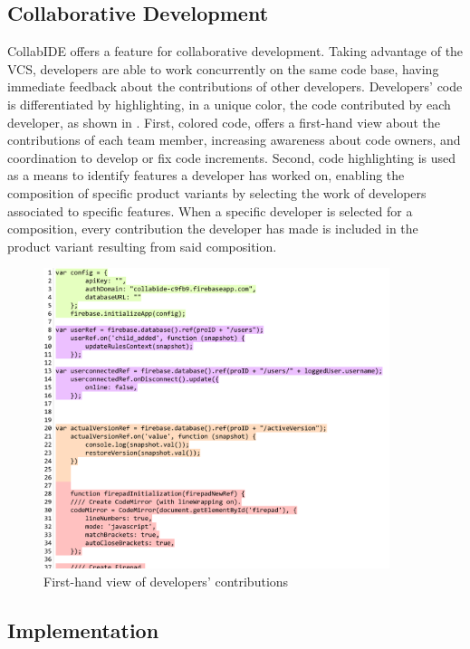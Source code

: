 \subsection{Collaborative Development}

CollabIDE offers a feature for collaborative development. Taking advantage of the \ac{VCS}, developers 
are able to work concurrently on the same code base, having immediate feedback about the 
contributions of other developers.
Developers' code is differentiated by highlighting, in a unique color, the code contributed by each 
developer, as shown in . First, colored code, offers a first-hand view about the 
contributions of each team member, increasing awareness  about code owners, and coordination to 
develop or fix code increments. Second, code highlighting is used as a means to identify features a 
developer has worked on, enabling the composition of specific product variants by selecting the work 
of developers associated to specific features. When a specific developer is selected for a composition,
every contribution the developer has made is included in the product variant resulting from said composition.

\begin{figure}[htbp]
  \centering
  \includegraphics[width=0.9\textwidth]{img/fig2-collabIDEConcurrentProgramming}
  \caption{First-hand view of developers' contributions}
  \label{fig:layers}
\end{figure}


\subsection{Implementation}
\label{sec:implementation}

